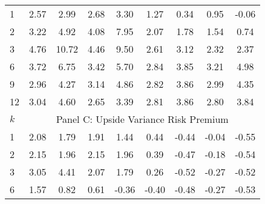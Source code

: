 \documentclass[11pt]{article}
\begin{document}
\begin{table}
\begin{center}
\begin{tabular}{lllllllll}
\hline
1 & \multicolumn{1}{c}{2.57} & \multicolumn{1}{c}{2.99} & \multicolumn{1}{c}{2.68} & \multicolumn{1}{c}{3.30} & \multicolumn{1}{c}{1.27} & \multicolumn{1}{c}{0.34} & \multicolumn{1}{c}{0.95} & \multicolumn{1}{c}{-0.06} \\
2 & \multicolumn{1}{c}{3.22} & \multicolumn{1}{c}{4.92} & \multicolumn{1}{c}{4.08} & \multicolumn{1}{c}{7.95} & \multicolumn{1}{c}{2.07} & \multicolumn{1}{c}{1.78} & \multicolumn{1}{c}{1.54} & \multicolumn{1}{c}{0.74} \\
3 & \multicolumn{1}{c}{4.76} & \multicolumn{1}{c}{10.72} & \multicolumn{1}{c}{4.46} & \multicolumn{1}{c}{9.50} & \multicolumn{1}{c}{2.61} & \multicolumn{1}{c}{3.12} & \multicolumn{1}{c}{2.32} & \multicolumn{1}{c}{2.37} \\
6 & \multicolumn{1}{c}{3.72} & \multicolumn{1}{c}{6.75} & \multicolumn{1}{c}{3.42} & \multicolumn{1}{c}{5.70} & \multicolumn{1}{c}{2.84} & \multicolumn{1}{c}{3.85} & \multicolumn{1}{c}{3.21} & \multicolumn{1}{c}{4.98} \\
9 & \multicolumn{1}{c}{2.96} & \multicolumn{1}{c}{4.27} & \multicolumn{1}{c}{3.14} & \multicolumn{1}{c}{4.86} & \multicolumn{1}{c}{2.82} & \multicolumn{1}{c}{3.86} & \multicolumn{1}{c}{2.99} & \multicolumn{1}{c}{4.35} \\
12 & \multicolumn{1}{c}{3.04} & \multicolumn{1}{c}{4.60} & \multicolumn{1}{c}{2.65} & \multicolumn{1}{c}{3.39} & \multicolumn{1}{c}{2.81} & \multicolumn{1}{c}{3.86} & \multicolumn{1}{c}{2.80} & \multicolumn{1}{c}{3.84} \\
\hline
$k$ & \multicolumn{8}{c}{Panel C: Upside Variance Risk Premium} \\
\hline
1 & \multicolumn{1}{c}{2.08} & \multicolumn{1}{c}{1.79} & \multicolumn{1}{c}{1.91} & \multicolumn{1}{c}{1.44} & \multicolumn{1}{c}{0.44} & \multicolumn{1}{c}{-0.44} & \multicolumn{1}{c}{-0.04} & \multicolumn{1}{c}{-0.55} \\
2 & \multicolumn{1}{c}{2.15} & \multicolumn{1}{c}{1.96} & \multicolumn{1}{c}{2.15} & \multicolumn{1}{c}{1.96} & \multicolumn{1}{c}{0.39} & \multicolumn{1}{c}{-0.47} & \multicolumn{1}{c}{-0.18} & \multicolumn{1}{c}{-0.54} \\
3 & \multicolumn{1}{c}{3.05} & \multicolumn{1}{c}{4.41} & \multicolumn{1}{c}{2.07} & \multicolumn{1}{c}{1.79} & \multicolumn{1}{c}{0.26} & \multicolumn{1}{c}{-0.52} & \multicolumn{1}{c}{-0.27} & \multicolumn{1}{c}{-0.52} \\
6 & \multicolumn{1}{c}{1.57} & \multicolumn{1}{c}{0.82} & \multicolumn{1}{c}{0.61} & \multicolumn{1}{c}{-0.36} & \multicolumn{1}{c}{-0.40} & \multicolumn{1}{c}{-0.48} & \multicolumn{1}{c}{-0.27} & \multicolumn{1}{c}{-0.53} \\

\end{tabular}
\end{center}
\end{table}
\end{document}
